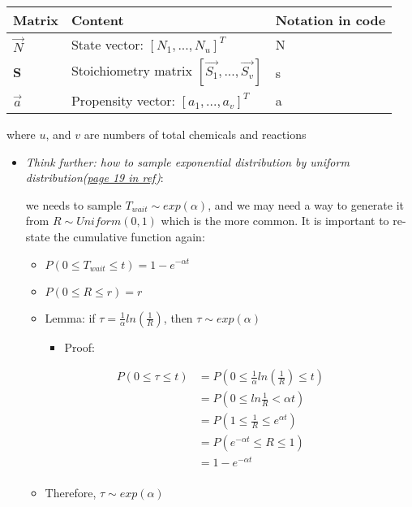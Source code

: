 \documentclass[11pt]{article}
\providecommand{\tightlist}{%
      \setlength{\itemsep}{0pt}\setlength{\parskip}{0pt}}
\begin{document}
\begin{longtable}[]{@{}lll@{}}
\toprule
Matrix & Content & Notation in code\tabularnewline
\midrule
\endhead
\(\vec{N}\) & State vector: \([N_1,...,N_u]^{T}\) & N\tabularnewline
\(\textbf{S}\) & Stoichiometry matrix \([\vec{S_1},...,\vec{S_v}]\) &
s\tabularnewline
\(\vec{a}\) & Propensity vector: \([a_1,...,a_v]^{T}\) &
a\tabularnewline
\bottomrule
\end{longtable}

where \(u\), and \(v\) are numbers of total chemicals and reactions

\begin{itemize}
\item
  \emph{Think further: how to sample exponential distribution by uniform
  distribution(\href{http://q-bio.org/w/images/3/37/Slides-Munsky.pdf}{page
  19 in ref})}:

  we needs to sample \(T_{wait} \sim exp(\alpha)\), and we may need a
  way to generate it from \(R \sim Uniform(0,1)\) which is the more
  common. It is important to re-state the cumulative function again:

  \begin{itemize}
  \item
    \(P(0 \leq T_{wait} \leq t) = 1 - e^{-\alpha t}\)
  \item
    \(P(0 \leq R \leq r) = r\)
  \item
    Lemma: if \(\tau = \frac{1}{\alpha} ln(\frac{1}{R})\), then
    \(\tau \sim exp(\alpha)\)

    \begin{itemize}
    \tightlist
    \item
      Proof:
    \end{itemize}
  \end{itemize}

  \begin{align}
  P(0 \leq \tau \leq t) &= P(0 \leq \frac{1}{\alpha} ln(\frac{1}{R}) \leq t) \\
                        &= P(0 \leq ln\frac{1}{R} < \alpha t) \\
                        &= P(1 \leq \frac{1}{R} \leq e^{\alpha t}) \\
                        &= P(e^{-\alpha t} \leq R \leq 1) \\
                        &= 1 - e^{-\alpha t} \\
  \end{align}

  \begin{itemize}
  \tightlist
  \item
    Therefore, \(\tau \sim exp(\alpha)\)
  \end{itemize}
\end{itemize}
\end{document}
